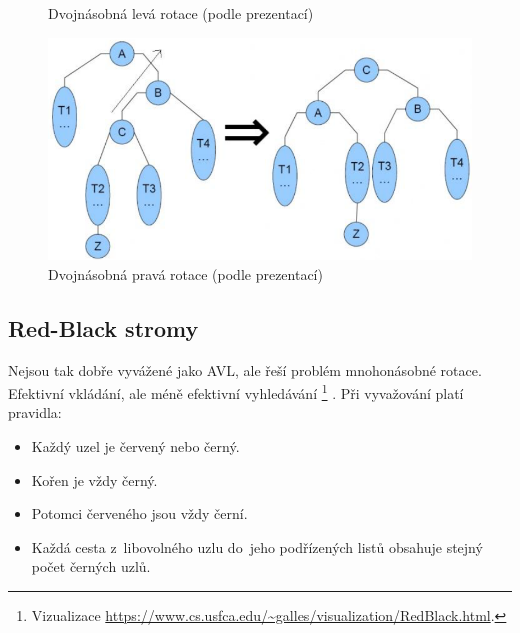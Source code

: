 \begin{figure}[htb]
\begin{minipage}[b]{0.47\textwidth}
        \caption{Dvojnásobná levá rotace (podle prezentací)}
    \end{minipage}
    \hspace*{1em}
    \begin{minipage}[b]{0.47\textwidth}
        \includegraphics[width=\textwidth]{images/dvojnasobnaprava.png}
        \caption{Dvojnásobná pravá rotace (podle prezentací)}
    \end{minipage}
\end{figure}

\subsection{Red-Black stromy}

Nejsou tak dobře vyvážené jako AVL, ale řeší problém mnohonásobné rotace. Efektivní vkládání, ale méně efektivní vyhledávání%
\footnote{Vizualizace \url{https://www.cs.usfca.edu/~galles/visualization/RedBlack.html}.}%
. Při vyvažování platí pravidla:
\begin{itemize}
	\item Každý uzel je červený nebo černý.
	\item Kořen je vždy černý.
	\item Potomci červeného jsou vždy černí.
	\item Každá cesta z~libovolného uzlu do~jeho podřízených listů obsahuje stejný počet černých uzlů.
\end{itemize}



